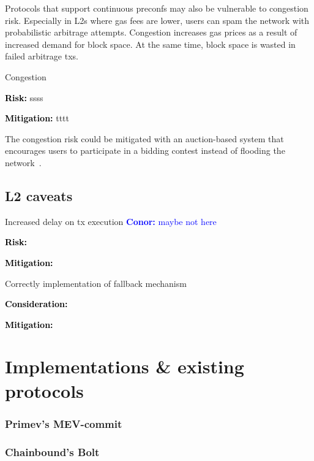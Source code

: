 \documentclass[a4paper]{article}
\theoremstyle{boldstyle}
\newlength{\entrysep}
\newcommand{\risk}[1]{\par\noindent\textbf{\textcolor{black}{Risk:}} #1\par\vspace{\entrysep}}
\newcommand{\consideration}[1]{\par\noindent\textbf{\textcolor{black}{Consideration:}} #1\par\vspace{\entrysep}}
\newcommand{\mitigation}[1]{\par\noindent\textbf{\textcolor{black}{Mitigation:}} #1}
\newcommand{\cm}[1]{\textcolor{blue}{\textbf{Conor:} #1}}
\begin{document}
        Protocols that support continuous preconfs may also be vulnerable to congestion risk. Especially in L2s where gas fees are lower, users can spam the network with probabilistic arbitrage attempts. Congestion increases gas prices as a result of increased demand for block space. At the same time, block space is wasted in failed arbitrage txs. 
        \begin{riskbox}{Congestion}
            \risk{ssss}
            \mitigation{tttt}
        \end{riskbox}
        The congestion risk could be mitigated with an auction-based system that encourages users to participate in a bidding contest instead of flooding the network~\cite{W:StrawmanningBasedPreconfirmations,W:BasedPreconfirmationswithMulti-roundMEV-Boost}.

    \subsection{L2 caveats}

        \begin{riskbox}{Increased delay on tx execution \cm{maybe not here}}
            \risk{}
            \mitigation{}
        \end{riskbox}


        \begin{considerationbox}{Correctly implementation of fallback mechanism}
            \consideration{}
            \mitigation{}
        \end{considerationbox}


\section{Implementations \& existing protocols}

        \subsubsection{ \textbf{Primev's MEV-commit}}
        

        \subsubsection{ \textbf{Chainbound's Bolt}}
        
\end{document}
